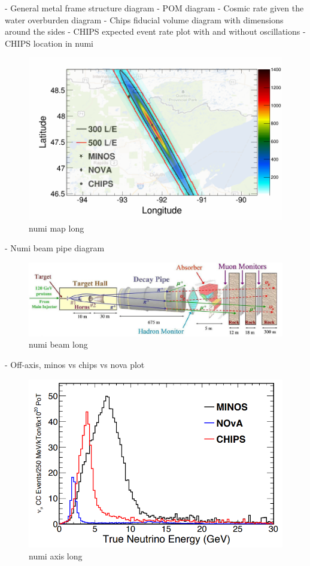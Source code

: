 - General metal frame structure diagram
- POM diagram
- Cosmic rate given the water overburden diagram
- Chips fiducial volume diagram with dimensions around the sides
- CHIPS expected event rate plot with and without oscillations
- CHIPS location in numi
\begin{figure}
    \includegraphics[width=\textwidth]{diagrams/4-chips/numi_map.png}
    \caption[numi map short]{numi map long}
    \label{fig:numi_map}
\end{figure}
- Numi beam pipe diagram
\begin{figure}
    \includegraphics[width=\textwidth]{diagrams/4-chips/numi_beam.png}
    \caption[numi beam short]{numi beam long}
    \label{fig:numi_beam}
\end{figure}
- Off-axis, minos vs chips vs nova plot
\begin{figure}
    \includegraphics[width=\textwidth]{diagrams/4-chips/numi_axis.png}
    \caption[numi axis short]{numi axis long}
    \label{fig:numi_axis}
\end{figure}
